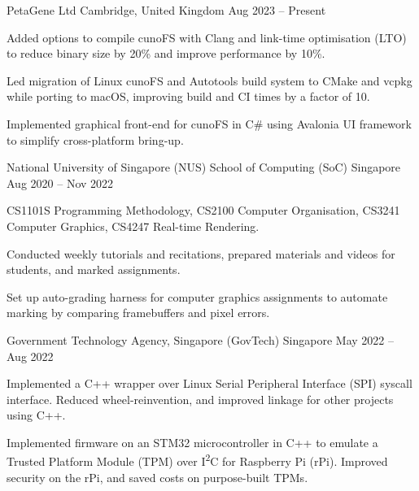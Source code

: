 \begin{cventries}
	{PetaGene Ltd} %
	{Cambridge, United Kingdom} %
	{Aug 2023 -- Present} %
	{
		\begin{cvitems} %
			\item Added options to compile cunoFS with Clang and link-time optimisation (LTO) to reduce binary size by 20\% and improve performance by 10\%.
			\item Led migration of Linux cunoFS and Autotools build system to CMake and vcpkg while porting to macOS, improving build and CI times by a factor of 10.
			\item Implemented graphical front-end for cunoFS in C\# using Avalonia UI framework to simplify cross-platform bring-up.
		\end{cvitems}
	}


	{National University of Singapore (NUS) School of Computing (SoC)} %
	{Singapore} %
	{Aug 2020 -- Nov 2022} %
	{
		\begin{cvitems} %
			\item CS1101S Programming Methodology, CS2100 Computer Organisation, CS3241 Computer Graphics, CS4247 Real-time Rendering.
			\item Conducted weekly tutorials and recitations, prepared materials and videos for students, and marked assignments.
			\item Set up auto-grading harness for computer graphics assignments to automate marking by comparing framebuffers and pixel errors.
		\end{cvitems}
	}


	{Government Technology Agency, Singapore (GovTech)} %
	{Singapore} %
	{May 2022 -- Aug 2022} %
	{
		\begin{cvitems} %
			\item Implemented a C++ wrapper over Linux Serial Peripheral Interface (SPI) syscall interface. Reduced wheel-reinvention, and improved linkage for other projects using C++.
			\item Implemented firmware on an STM32 microcontroller in C++ to emulate a Trusted Platform Module (TPM) over I\textsuperscript{2}C for Raspberry Pi (rPi). Improved security on the rPi, and saved costs on purpose-built TPMs.
		\end{cvitems}
	}


\end{cventries}
